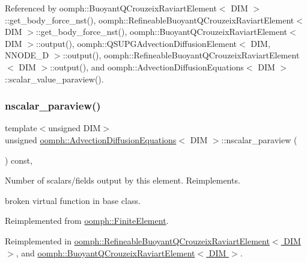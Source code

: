 Referenced by oomph\+::\+Buoyant\+Q\+Crouzeix\+Raviart\+Element$<$ D\+I\+M $>$\+::get\+\_\+body\+\_\+force\+\_\+nst(), oomph\+::\+Refineable\+Buoyant\+Q\+Crouzeix\+Raviart\+Element$<$ D\+I\+M $>$\+::get\+\_\+body\+\_\+force\+\_\+nst(), oomph\+::\+Buoyant\+Q\+Crouzeix\+Raviart\+Element$<$ D\+I\+M $>$\+::output(), oomph\+::\+Q\+S\+U\+P\+G\+Advection\+Diffusion\+Element$<$ D\+I\+M, N\+N\+O\+D\+E\+\_\+D $>$\+::output(), oomph\+::\+Refineable\+Buoyant\+Q\+Crouzeix\+Raviart\+Element$<$ D\+I\+M $>$\+::output(), and oomph\+::\+Advection\+Diffusion\+Equations$<$ D\+I\+M $>$\+::scalar\+\_\+value\+\_\+paraview().

\mbox{\label{classoomph_1_1AdvectionDiffusionEquations_a70205e9d39d7ff9660a53402d5636c1f}} 
\subsubsection{\texorpdfstring{nscalar\+\_\+paraview()}{nscalar\_paraview()}}
{\footnotesize\ttfamily template$<$unsigned D\+IM$>$ \\
unsigned \hyperlink{classoomph_1_1AdvectionDiffusionEquations}{oomph\+::\+Advection\+Diffusion\+Equations}$<$ D\+IM $>$\+::nscalar\+\_\+paraview (\begin{DoxyParamCaption}{ }\end{DoxyParamCaption}) const\hspace{0.3cm}{\ttfamily [inline]}, {\ttfamily [virtual]}}



Number of scalars/fields output by this element. Reimplements. 

broken virtual function in base class. 

Reimplemented from \hyperlink{classoomph_1_1FiniteElement_a865e2e5586552ba80babdbe26a77fe8c}{oomph\+::\+Finite\+Element}.



Reimplemented in \hyperlink{classoomph_1_1RefineableBuoyantQCrouzeixRaviartElement_a2167093a1902a2ed4c79d45eff457ca8}{oomph\+::\+Refineable\+Buoyant\+Q\+Crouzeix\+Raviart\+Element$<$ D\+I\+M $>$}, and \hyperlink{classoomph_1_1BuoyantQCrouzeixRaviartElement_a5103e49416e1a0e36a2e8e117fb78623}{oomph\+::\+Buoyant\+Q\+Crouzeix\+Raviart\+Element$<$ D\+I\+M $>$}.



